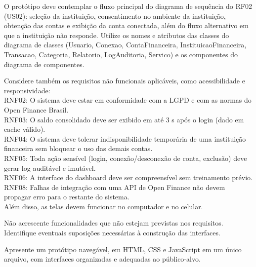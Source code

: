 \documentclass[11pt,a4paper]{article}
\begin{document}
\begin{tcolorbox}[breakable, colback=promptfill, colframe=promptfill, boxrule=0pt, arc=2pt, left=8pt, right=8pt, top=6pt, bottom=6pt, fontupper=\footnotesize, before upper={\setlength{\parskip}{5pt}}]
O protótipo deve contemplar o fluxo principal do diagrama de sequência do RF02 (US02): seleção da instituição, consentimento no ambiente da instituição, obtenção das contas e exibição da conta conectada, além do fluxo alternativo em que a instituição não responde. Utilize os nomes e atributos das classes do diagrama de classes (Usuario, Conexao, ContaFinanceira, InstituicaoFinanceira, Transacao, Categoria, Relatorio, LogAuditoria, Servico) e os componentes do diagrama de componentes.

Considere também os requisitos não funcionais aplicáveis, como acessibilidade e responsividade:\\
RNF02: O sistema deve estar em conformidade com a LGPD e com as normas do Open Finance Brasil.\\
RNF03: O saldo consolidado deve ser exibido em até 3 s após o login (dado em cache válido).\\
RNF04: O sistema deve tolerar indisponibilidade temporária de uma instituição financeira sem bloquear o uso das demais contas.\\
RNF05: Toda ação sensível (login, conexão/desconexão de conta, exclusão) deve gerar log auditável e imutável.\\
RNF06: A interface do dashboard deve ser compreensível sem treinamento prévio.\\
RNF08: Falhas de integração com uma API de Open Finance não devem propagar erro para o restante do sistema.\\
Além disso, as telas devem funcionar no computador e no celular.

Não acrescente funcionalidades que não estejam previstas nos requisitos. Identifique eventuais suposições necessárias à construção das interfaces.

Apresente um protótipo navegável, em HTML, CSS e JavaScript em um único arquivo, com interfaces organizadas e adequadas ao público-alvo.
\end{tcolorbox}
\end{document}
